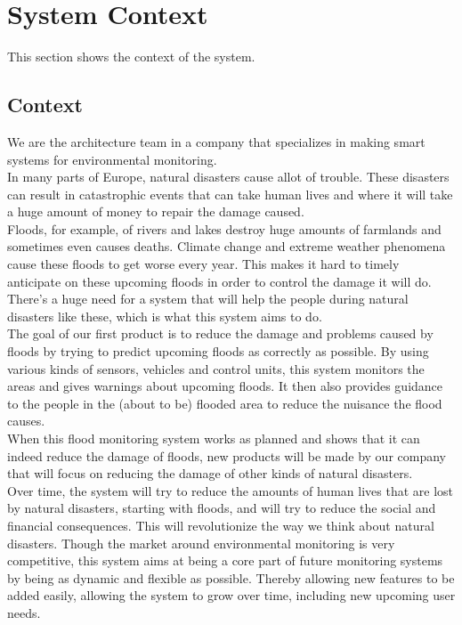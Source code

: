 \chapter{System Context}
\label{ch:context}

This section shows the context of the system.

\section{Context}
We are the architecture team in a company that specializes in making smart systems for environmental monitoring.\\
In many parts of Europe, natural disasters cause allot of trouble. These disasters can result in catastrophic events that can take human lives and where it will take a huge amount of money to repair the damage caused.\\
Floods, for example, of rivers and lakes destroy huge amounts of farmlands and sometimes even causes deaths. Climate change and extreme weather phenomena cause these floods to get worse every year. This makes it hard to timely anticipate on these upcoming floods in order to control the damage it will do. There's a huge need for a system that will help the people during natural disasters like these, which is what this system aims to do.\\
The goal of our first product is to reduce the damage and problems caused by floods by trying to predict upcoming floods as correctly as possible. By using various kinds of sensors, vehicles and control units, this system monitors the areas and gives warnings about upcoming floods. It then also provides guidance to the people in the (about to be) flooded area to reduce the nuisance the flood causes.\\
When this flood monitoring system works as planned and shows that it can indeed reduce the damage of floods, new products will be made by our company that will focus on reducing the damage of other kinds of natural disasters.\\
Over time, the system will try to reduce the amounts of human lives that are lost by natural disasters, starting with floods, and will try to reduce the social and financial consequences. This will revolutionize the way we think about natural disasters. Though the market around environmental monitoring is very competitive, this system aims at being a core part of future monitoring systems by being as dynamic and flexible as possible. Thereby allowing new features to be added easily, allowing the system to grow over time, including new upcoming user needs.